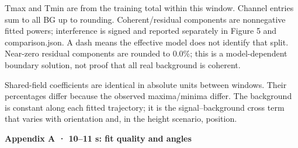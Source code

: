 \documentclass[10pt,a4paper]{article}
\newcommand{\heading}[1]{{\sffamily\Large\bfseries\color{ink}#1}\par\vspace{7pt}}
\begin{document}
Tmax and Tmin are from the training total within this window. Channel entries sum to all BG up to rounding. Coherent/residual components are nonnegative fitted powers; interference is signed and reported separately in Figure 5 and comparison.json. A dash means the effective model does not identify that split. Near-zero residual components are rounded to 0.0\%; this is a model-dependent boundary solution, not proof that all real background is coherent.\par
Shared-field coefficients are identical in absolute units between windows. Their percentages differ because the observed maxima/minima differ. The background is constant along each fitted trajectory; it is the signal–background cross term that varies with orientation and, in the height scenario, position.\par
\clearpage
\heading{Appendix A · 10–11 s: fit quality and angles}
\end{document}
